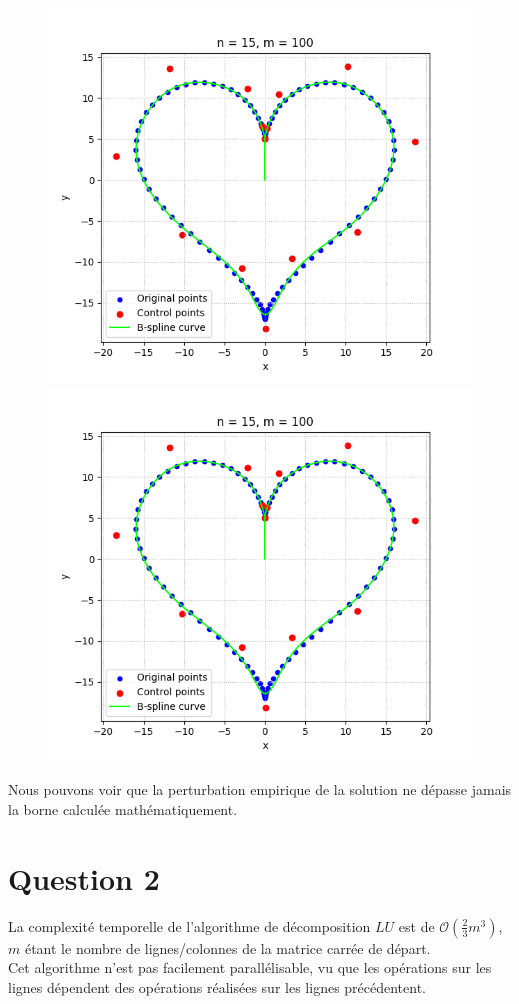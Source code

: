 \documentclass[11pt]{article}
\begin{document}
\begin{figure}[H]
    \includegraphics[scale=0.5]{../../Devoir1/rapport/images/coeur1.png}
    \includegraphics[scale=0.5]{../../Devoir1/rapport/images/coeur1.png}
\end{figure}
Nous pouvons voir que la perturbation empirique de la solution ne dépasse jamais la borne calculée mathématiquement.


\section*{Question 2}
La complexité temporelle de l'algorithme de décomposition $LU$ est de $\mathcal{O}(\frac{2}{3}m^3)$, $m$ étant le nombre de lignes/colonnes de la matrice carrée de départ.\\
Cet algorithme n'est pas facilement parallélisable, vu que les opérations sur les lignes dépendent des opérations réalisées sur les lignes précédentent.
\end{document}
